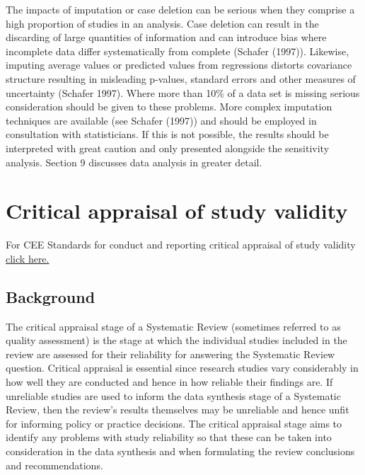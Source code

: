 \documentclass[
  letterpaper,
  DIV=11,
  numbers=noendperiod]{scrreprt}
\begin{document}
The impacts of imputation or case deletion can be serious when they
comprise a high proportion of studies in an analysis. Case deletion can
result in the discarding of large quantities of information and can
introduce bias where incomplete data differ systematically from complete
(Schafer (1997)). Likewise, imputing average values or predicted values
from regressions distorts covariance structure resulting in misleading
p-values, standard errors and other measures of uncertainty (Schafer
1997). Where more than 10\% of a data set is missing serious
consideration should be given to these problems. More complex imputation
techniques are available (see Schafer (1997)) and should be employed in
consultation with statisticians. If this is not possible, the results
should be interpreted with great caution and only presented alongside
the sensitivity analysis. Section 9 discusses data analysis in greater
detail.


\chapter{Critical appraisal of study validity}\label{sec-chapt7}

For CEE Standards for conduct and reporting critical appraisal of study
validity \href{https://environmentalevidence.org/standards-table/}{click
here.}

\section{\texorpdfstring{\textbf{Background}}{Background}}\label{background-2}

The critical appraisal stage of a Systematic Review (sometimes referred
to as quality assessment) is the stage at which the individual studies
included in the review are assessed for their reliability for answering
the Systematic Review question. Critical appraisal is essential since
research studies vary considerably in how well they are conducted and
hence in how reliable their findings are. If unreliable studies are used
to inform the data synthesis stage of a Systematic Review, then the
review's results themselves may be unreliable and hence unfit for
informing policy or practice decisions. The critical appraisal stage
aims to identify any problems with study reliability so that these can
be taken into consideration in the data synthesis and when formulating
the review conclusions and recommendations.
\end{document}
